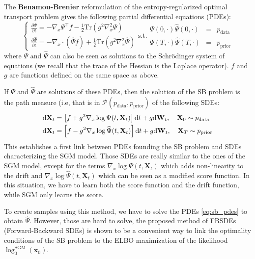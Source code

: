 \documentclass{article}
\begin{document}
The \textbf{Benamou-Brenier} reformulation of the entropy-regularized optimal transport problem gives the following partial differential equations (PDEs):
\begin{equation}
    \label{eq:sb_pdes}
    \begin{cases}
    \frac{\partial \Psi}{\partial t} = -\nabla_x \Psi^\top f - \frac{1}{2}\mathrm{Tr}(g^2 \nabla_x^2 \Psi) \\[7pt]
    \frac{\partial \widehat{\Psi}}{\partial t} = -\nabla_x \cdot (\widehat{\Psi} f) + \frac{1}{2}\mathrm{Tr}(g^2 \nabla_x^2 \widehat{\Psi})
    \end{cases}
    \mathrm{s.t.}
    \begin{array}{lcl}
        \Psi(0, \cdot) \widehat{\Psi}(0, \cdot) &=& p_\mathrm{data}\\
        \Psi(T, \cdot) \widehat{\Psi}(T, \cdot) &=& p_\mathrm{prior}
    \end{array}
\end{equation}
where $\Psi$ and $\widehat\Psi$ can also be seen as solutions to the Schrödinger system of equations (we recall that the trace of the Hessian is the Laplace operator). $f$ and $g$ are functions defined on the same space as above.

If $\Psi$ and $\widehat\Psi$ are solutions of these PDEs, then the solution of the SB problem is the path measure (i.e, that is in $\mathcal{P}(p_\mathrm{data}, p_\mathrm{prior})$ of the following SDEs:
\begin{equation}
    \label{eq:sb_sdes}
\begin{aligned}
    \mathrm{d}\mathbf{X}_t & = \left\lbrack f+g^2\nabla_x\log\Psi(t,\mathbf{X}_t) \right\rbrack\mathrm{d} t + g\mathrm{d} \mathbf{W}_t, \quad \mathbf{X}_0 \sim p_\mathrm{data}\\
    \mathrm{d} \mathbf{X}_t & = \left\lbrack f-g^2\nabla_x\log\widehat\Psi(t,\mathbf{X}_t) \right\rbrack\mathrm{d} t + g \mathrm{d} \mathbf{W}_t, \quad \mathbf{X}_T \sim p_\mathrm{prior}
\end{aligned}
\end{equation}
This establishes a first link between PDEs founding the SB problem and SDEs characterizing the SGM model.
Those SDEs are really similar to the ones of the SGM model, except for the terms $\nabla_x\log\Psi(t,\mathbf{X}_t)$ which adds non-linearity to the drift and $\nabla_x\log\widehat\Psi(t,\mathbf{X}_t)$ which can be seen as a modified score function.
In this situation, we have to learn both the score function and the drift function, while SGM only learns the score.

To create samples using this method, we have to solve the PDEs \eqref{eq:sb_pdes} to obtain $\widehat\Psi$.
However, those are hard to solve, the proposed method of FBSDEs (Forward-Backward SDEs) is shown to be a convenient way to link the optimality conditions of the SB problem to the ELBO maximization of the likelihood $\log_0^\mathrm{SGM}(\mathbf{x}_0)$.
\end{document}
